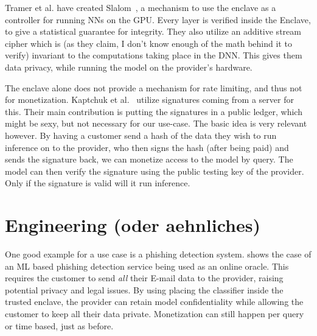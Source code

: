\documentclass[11pt,twocolumn]{article}
\newcommand{\mail}{E-mail}
\begin{document}
Tramer et al. have created Slalom~\cite{tramer_slalom_2019}, a mechanism to use the enclave as a controller for running NNs on the GPU.
Every layer is verified inside the Enclave, to give a statistical guarantee for integrity.
They also utilize an additive stream cipher which is (as they claim, I don't know enough of the math behind it to verify) invariant to the computations taking place in the DNN.
This gives them data privacy, while running the model on the provider's hardware.

The enclave alone does not provide a mechanism for rate limiting, and thus not for monetization.
Kaptchuk et al.~\cite{kaptchuk_giving_nodate} utilize signatures coming from a server for this.
Their main contribution is putting the signatures in a public ledger, which might be sexy, but not necessary for our use-case.
The basic idea is very relevant however.
By having a customer send a hash of the data they wish to run inference on to the provider, who then signs the hash (after being paid) and sends the signature back, we can monetize access to the model by query.
The model can then verify the signature using the public testing key of the provider.
Only if the signature is valid will it run inference.

\section{Engineering (oder aehnliches)}
\label{sec:engineering}

One good example for a use case is a phishing detection system.
 shows the case of an ML based phishing detection service being used as an online oracle.
This requires the customer to send \emph{all} their \mail{} data to the provider, raising potential privacy and legal issues.
By using placing the classifier inside the trusted enclave, the provider can retain model confidentiality while allowing the customer to keep all their data private.
Monetization can still happen per query or time based, just as before.
\end{document}
